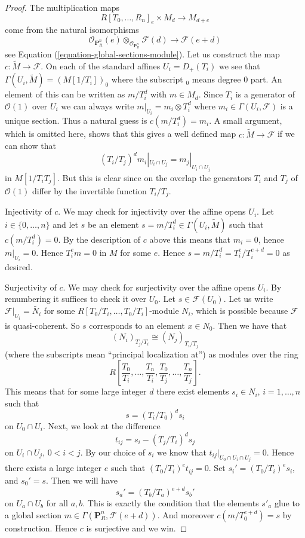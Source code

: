 \documentclass{stacks-project}
\theoremstyle{plain}
\theoremstyle{definition}
\theoremstyle{remark}
\numberwithin{equation}{subsection}
\begin{document}
\begin{proof}
The multiplication maps
$$
R[T_0, \ldots, R_n]_e \times M_d \longrightarrow M_{d + e}
$$
come from the natural isomorphisms
$$
\mathcal{O}_{\mathbf{P}^n_R}(e)
\otimes_{\mathcal{O}_{\mathbf{P}^n_R}}
\mathcal{F}(d)
\longrightarrow
\mathcal{F}(e + d)
$$
see Equation (\ref{equation-global-sections-module}). Let us construct the
map $c : \widetilde{M} \to \mathcal{F}$. On each of the standard affines
$U_i = D_{+}(T_i)$ we see that $\Gamma(U_i, \widetilde{M}) = (M[1/T_i])_0$
where the subscript ${}_0$ means degree $0$ part. An element of this
can be written as $m/T_i^d$ with $m \in M_d$. Since $T_i$ is a generator
of $\mathcal{O}(1)$ over $U_i$ we can always write
$m|_{U_i} = m_i \otimes T_i^d$ where $m_i \in \Gamma(U_i, \mathcal{F})$
is a unique section. Thus a natural guess is $c(m/T_i^d) = m_i$.
A small argument, which is omitted here, shows that this gives a
well defined map $c : \widetilde{M} \to \mathcal{F}$ if we can
show that
$$
(T_i/T_j)^d m_i|_{U_i \cap U_j} = m_j|_{U_i \cap U_j}
$$
in $M[1/T_iT_j]$.
But this is clear since on the overlap the generators $T_i$ and
$T_j$ of $\mathcal{O}(1)$ differ by the invertible function $T_i/T_j$.

\medskip\noindent
Injectivity of $c$. We may check for injectivity over the affine opens
$U_i$. Let $i \in \{0, \ldots, n\}$
and let $s$ be an element $s = m/T_i^d \in \Gamma(U_i, \widetilde{M})$
such that $c(m/T_i^d) = 0$. By the description of $c$ above this means that
$m_i = 0$, hence $m|_{U_i} = 0$. Hence $T_i^em = 0$ in $M$ for some
$e$. Hence $s = m/T_i^d = T_i^e/T_i^{e + d} = 0$ as desired.

\medskip\noindent
Surjectivity of $c$. We may check for surjectivity over the affine opens
$U_i$. By renumbering it suffices to check it over $U_0$.
Let $s \in \mathcal{F}(U_0)$.
Let us write $\mathcal{F}|_{U_i} = \widetilde{N_i}$ for some
$R[T_0/T_i, \ldots, T_0/T_i]$-module $N_i$, which is possible because
$\mathcal{F}$ is quasi-coherent. So $s$ corresponds to an element
$x \in N_0$. Then we have that
$$
(N_i)_{T_j/T_i} \cong (N_j)_{T_i/T_j}
$$
(where the subscripts mean ``principal localization at'')
as modules over the ring
$$
R\left[
\frac{T_0}{T_i}, \ldots, \frac{T_n}{T_i},
\frac{T_0}{T_j}, \ldots, \frac{T_n}{T_j}
\right].
$$
This means that for some large integer $d$ there exist elements
$s_i \in N_i$, $i = 1, \ldots, n$ such that
$$
s = (T_i/T_0)^d s_i
$$
on $U_0 \cap U_i$. Next, we look at the difference
$$
t_{ij} = s_i - (T_j/T_i)^d s_j
$$
on $U_i \cap U_j$, $0 < i < j$. By our choice of $s_i$ we know that
$t_{ij}|_{U_0 \cap U_i \cap U_j} = 0$. Hence there exists a large integer
$e$ such that $(T_0/T_i)^et_{ij} = 0$. Set $s_i' = (T_0/T_i)^es_i$,
and $s_0' = s$. Then we will have
$$
s_a' = (T_b/T_a)^{e + d} s_b'
$$
on $U_a \cap U_b$ for all $a, b$. This is exactly the condition that the
elements $s'_a$ glue to a global section
$m \in \Gamma(\mathbf{P}^n_R, \mathcal{F}(e + d))$.
And moreover $c(m/T_0^{e + d}) = s$ by construction. Hence $c$ is
surjective and we win.
\end{proof}
\end{document}
